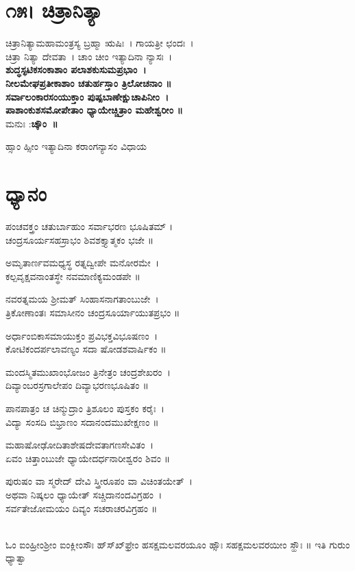 \section{೧೫। ಚಿತ್ರಾನಿತ್ಯಾ}
ಚಿತ್ರಾನಿತ್ಯಾಮಹಾಮಂತ್ರಸ್ಯ ಬ್ರಹ್ಮಾ ಋಷಿಃ~। ಗಾಯತ್ರೀ ಛಂದಃ~। \\ಚಿತ್ರಾ ನಿತ್ಯಾ ದೇವತಾ~। ಚಾಂ ಚೀಂ ಇತ್ಯಾದಿನಾ ನ್ಯಾಸಃ~।\\
{\bfseries ಶುದ್ಧಸ್ಫಟಿಕಸಂಕಾಶಾಂ ಪಲಾಶಕುಸುಮಪ್ರಭಾಂ~।\\
ನೀಲಮೇಘಪ್ರತೀಕಾಶಾಂ ಚತುರ್ಹಸ್ತಾಂ ತ್ರಿಲೋಚನಾಂ ॥\\
ಸರ್ವಾಲಂಕಾರಸಂಯುಕ್ತಾಂ ಪುಷ್ಪಬಾಣೇಕ್ಷುಚಾಪಿನೀಂ~।\\
ಪಾಶಾಂಕುಶಸಮೋಪೇತಾಂ ಧ್ಯಾಯೇಚ್ಚಿತ್ರಾಂ ಮಹೇಶ್ವರೀಂ ॥\\}
ಮನುಃ :{\bfseries  ಚ್ಕೌಂ~॥}


ಹ್ಸಾಂ ಹ್ಸೀಂ ಇತ್ಯಾದಿನಾ ಕರಾಂಗನ್ಯಾಸಂ ವಿಧಾಯ
\section{ಧ್ಯಾನಂ}
ಪಂಚವಕ್ತ್ರಂ ಚತುರ್ಬಾಹುಂ ಸರ್ವಾಭರಣ ಭೂಷಿತಮ್ ।\\
ಚಂದ್ರಸೂರ್ಯಸಹಸ್ರಾಭಂ ಶಿವಶಕ್ತ್ಯಾತ್ಮಕಂ ಭಜೇ ॥

ಅಮೃತಾರ್ಣವಮಧ್ಯಸ್ಥ ರತ್ನದ್ವೀಪೇ ಮನೋರಮೇ~।\\
ಕಲ್ಪವೃಕ್ಷವನಾಂತಸ್ಥೇ ನವಮಾಣಿಕ್ಯಮಂಡಪೇ ॥

ನವರತ್ನಮಯ ಶ್ರೀಮತ್ ಸಿಂಹಾಸನಾಗತಾಂಬುಜೇ~।\\
ತ್ರಿಕೋಣಾಂತಃ ಸಮಾಸೀನಂ ಚಂದ್ರಸೂರ್ಯಾಯುತಪ್ರಭಂ ॥

ಅರ್ಧಾಂಬಿಕಾಸಮಾಯುಕ್ತಂ ಪ್ರವಿಭಕ್ತವಿಭೂಷಣಂ~।\\
ಕೋಟಿಕಂದರ್ಪಲಾವಣ್ಯಂ ಸದಾ ಷೋಡಶವಾರ್ಷಿಕಂ ॥

ಮಂದಸ್ಮಿತಮುಖಾಂಭೋಜಂ ತ್ರಿನೇತ್ರಂ ಚಂದ್ರಶೇಖರಂ~।\\
ದಿವ್ಯಾಂಬರಸ್ರಗಾಲೇಪಂ ದಿವ್ಯಾಭರಣಭೂಷಿತಂ ॥

ಪಾನಪಾತ್ರಂ ಚ ಚಿನ್ಮುದ್ರಾಂ ತ್ರಿಶೂಲಂ ಪುಸ್ತಕಂ ಕರೈಃ~।\\
ವಿದ್ಯಾ ಸಂಸದಿ ಬಿಭ್ರಾಣಂ ಸದಾನಂದಮುಖೇಕ್ಷಣಂ ॥

ಮಹಾಷೋಢೋದಿತಾಶೇಷದೇವತಾಗಣಸೇವಿತಂ~।\\
ಏವಂ ಚಿತ್ತಾಂಬುಜೇ ಧ್ಯಾಯೇದರ್ಧನಾರೀಶ್ವರಂ ಶಿವಂ ॥

ಪುರುಷಂ ವಾ ಸ್ಮರೇದ್ ದೇವಿ ಸ್ತ್ರೀರೂಪಂ ವಾ ವಿಚಿಂತಯೇತ್~।\\
ಅಥವಾ ನಿಷ್ಕಲಂ ಧ್ಯಾಯೇತ್ ಸಚ್ಚಿದಾನಂದವಿಗ್ರಹಂ~।\\
ಸರ್ವತೇಜೋಮಯಂ ದಿವ್ಯಂ ಸಚರಾಚರವಿಗ್ರಹಂ ॥

\\
ಓಂ ಐಂಹ್ರೀಂಶ್ರೀಂ ಐಂಕ್ಲೀಂಸೌಃ ಹ್‌ಸ್‌ಖ್‌ಫ್ರೇಂ ಹಸಕ್ಷಮಲವರಯೂಂ ಹ್ಸೌಃ ಸಹಕ್ಷಮಲವರಯೀಂ ಸ್ಹೌಃ ॥ ಇತಿ ಗುರುಂ ಧ್ಯಾತ್ವಾ

